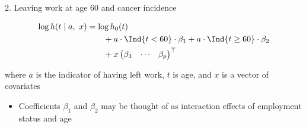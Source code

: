 \documentclass[
  10pt,
  ignorenonframetext,
]{beamer}
\providecommand{\tightlist}{%
  \setlength{\itemsep}{0pt}\setlength{\parskip}{0pt}}
\begin{document}
\begin{frame}{2. Leaving work at age 60 and cancer incidence}
\protect\hypertarget{leaving-work-at-age-60-and-cancer-incidence}{}

\[\begin{aligned}
\log h(t \mid a,\ x)
& = \log h_0 (t) \\ & \hspace{2em}
+ a \cdot \Ind{t < 60} \cdot \beta_1
+ a \cdot \Ind{t \ge 60} \cdot \beta_2 \\ & \hspace{2em}
+ x \begin{pmatrix}\beta_3 & \cdots & \beta_p\end{pmatrix}^\top
\end{aligned}\]

where \(a\) is the indicator of having left work, \(t\) is age, and
\(x\) is a vector of covariates

\begin{itemize}
\tightlist
\item
  Coefficients \(\beta_1\) and \(\beta_2\) may be thought of as
  interaction effects of employment status and age
\end{itemize}

\end{frame}
\end{document}
